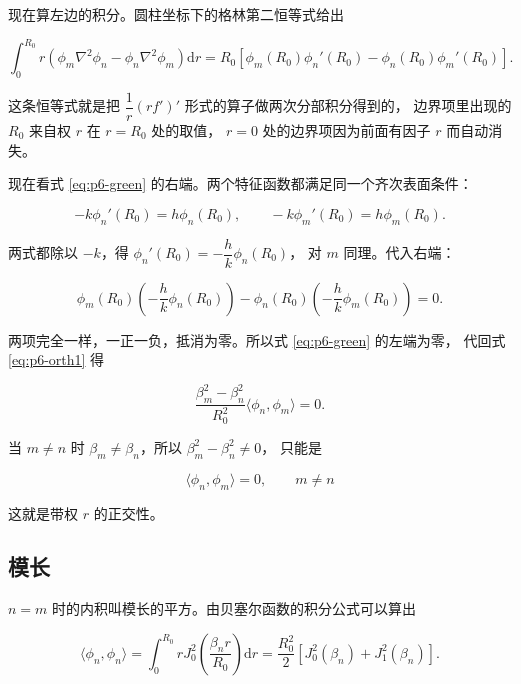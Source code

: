 现在算左边的积分。圆柱坐标下的格林第二恒等式给出

\begin{equation}
\int_0^{R_0} r\left(\phi_m\nabla^2\phi_n-\phi_n\nabla^2\phi_m\right)\mathrm{d}r
=R_0\left[\phi_m(R_0)\phi_n'(R_0)-\phi_n(R_0)\phi_m'(R_0)\right].
\label{eq:p6-green}
\end{equation}

这条恒等式就是把 $\dfrac{1}{r}(r f')'$ 形式的算子做两次分部积分得到的，
边界项里出现的 $R_0$ 来自权 $r$ 在 $r=R_0$ 处的取值，
$r=0$ 处的边界项因为前面有因子 $r$ 而自动消失。

现在看式 \eqref{eq:p6-green} 的右端。两个特征函数都满足同一个齐次表面条件：

\begin{equation}
-k\phi_n'(R_0)=h\phi_n(R_0),
\qquad
-k\phi_m'(R_0)=h\phi_m(R_0).
\end{equation}

两式都除以 $-k$，得 $\phi_n'(R_0)=-\dfrac{h}{k}\phi_n(R_0)$，
对 $m$ 同理。代入右端：

\begin{equation}
\phi_m(R_0)\left(-\frac{h}{k}\phi_n(R_0)\right)
-\phi_n(R_0)\left(-\frac{h}{k}\phi_m(R_0)\right)=0 .
\end{equation}

两项完全一样，一正一负，抵消为零。所以式 \eqref{eq:p6-green} 的左端为零，
代回式 \eqref{eq:p6-orth1} 得

\begin{equation}
\frac{\beta_m^2-\beta_n^2}{R_0^2}\langle\phi_n,\phi_m\rangle=0 .
\end{equation}

当 $m\ne n$ 时 $\beta_m\ne\beta_n$，所以 $\beta_m^2-\beta_n^2\ne0$，
只能是

\begin{equation}
\boxed{\ \langle\phi_n,\phi_m\rangle=0,\qquad m\ne n\ }
\label{eq:p6-orth}
\end{equation}

这就是带权 $r$ 的正交性。

\subsection{模长}

$n=m$ 时的内积叫模长的平方。由贝塞尔函数的积分公式可以算出

\begin{equation}
\langle\phi_n,\phi_n\rangle
=\int_0^{R_0} r J_0^2\!\left(\frac{\beta_n r}{R_0}\right)\mathrm{d}r
=\frac{R_0^2}{2}\left[J_0^2(\beta_n)+J_1^2(\beta_n)\right].
\label{eq:p6-norm}
\end{equation}

